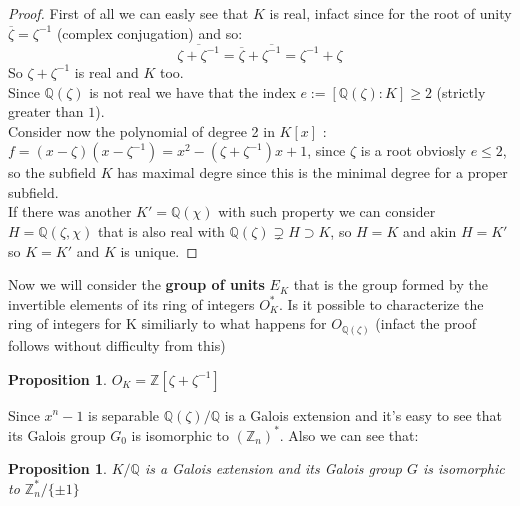 \documentclass[]{article}
\theoremstyle{plain}
\newtheorem{prop}[teo]{Proposition}
\theoremstyle{remark}
\theoremstyle{definition}
\newcommand{\Z}{\mathbb{Z}}
\newcommand{\Q}{\mathbb{Q}}
\begin{document}
	
	\begin{proof}
		First of all we can easly see that $ K $ is real, infact since for the root of unity $ \overline{\zeta} = \zeta ^{-1} $ (complex conjugation) and so:
		\begin{equation*}
		\overline{ \zeta + \zeta^{-1} }= \overline{ \zeta} + \overline{\zeta^{-1} } = \zeta ^{-1}  + \zeta
		\end{equation*}
		So $ \zeta + \zeta ^{-1} $ is real and $ K $ too.\\
		Since $ \Q (\zeta) $ is not real we have that the index $ e := [\Q (\zeta)  : K] \geq 2 $ (strictly greater than $ 1 $). \\
		Consider now the polynomial of degree 2 in $ K[x] $ : $ f = (x-\zeta)(x- \zeta^{-1}) = x^2 - (\zeta + \zeta ^{-1})x +1  $, since $\zeta$ is a root obviosly $ e \leq 2 $, so the subfield $ K $ has maximal degre since this is the minimal degree for a proper subfield. \\
		If there was another $ K' = \Q ( \chi ) $ with such property we can consider $ H = \Q (\zeta, \chi) $ that is also real with $ \Q (\zeta) \supsetneq H \supset K $, so $ H=K $ and akin $ H = K' $ so $ K = K' $ and $ K $ is unique.
	\end{proof}
	
	Now we will consider the \textbf{group of units} $ E_K$ that is the group formed by the invertible elements of its ring of integers $ O_K^\ast $. Is it possible to characterize the ring of integers for K \cite[Proposition~2.16]{CF} similiarly to what happens for $ O_{\Q (\zeta)} $ (infact the proof follows without difficulty from this)
	
	
	\begin{prop}
		$ O_K = \Z[\zeta + \zeta ^{-1}] $
	\end{prop}
	
	
	Since $ x^n - 1 $ is separable $ \Q (\zeta)  / \Q $ is a Galois extension and it's easy to see that its Galois group $ G_0  $ is isomorphic to $ ( \Z_{n} )^\ast $. Also we can see that:
	
	\begin{prop}
		$ K / \Q $ is a Galois extension and its Galois group $ G $ is isomorphic to $ \Z_{n}^*/ \{\pm 1\} $
	\end{prop}
	
\end{document}
